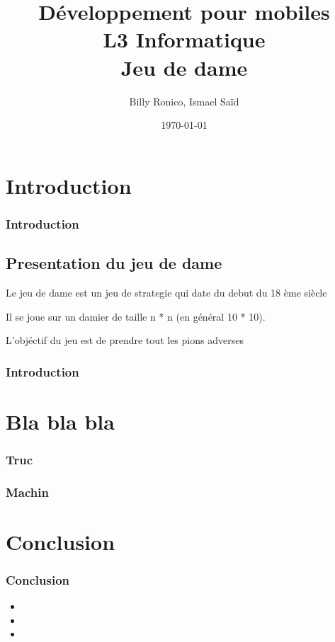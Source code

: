 \documentclass{beamer}
\title[Dev. Mobiles -- L3 info]{Développement pour mobiles\\L3 Informatique\\\textbf{Jeu de dame}}
\author{Billy Ronico, Ismael Saïd}
\institute[DI]{Université de la Réunin}
\date{\today}
\begin{document}
\begin{frame}
  \titlepage
\end{frame}


\section{Introduction}
%
%
\begin{frame}
  \frametitle{Introduction}
    \subsection{Presentation du jeu de dame}
    Le jeu de dame est un jeu de strategie qui date du debut du 18 ème siècle 
    
    Il se joue sur un damier de taille n * n (en général 10 * 10).

    L'objéctif du jeu est de prendre tout les pions adverses

\end{frame}
%
%
\begin{frame}
  \frametitle{Introduction}
\end{frame}
%
%
\section{Bla bla bla}
%
%
\begin{frame}
  \frametitle{Truc}
\end{frame}
%
%
\begin{frame}
  \frametitle{Machin}
\end{frame}
%
%
\section{Conclusion}
%
%
\begin{frame}
  \frametitle{Conclusion}
  \begin{itemize}
    \item
    \item
    \item
  \end{itemize}
\end{frame}
%
%
\end{document}
